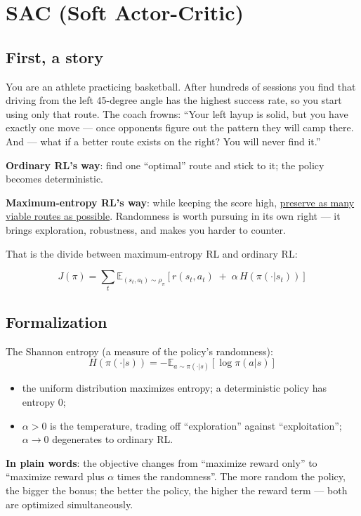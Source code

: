 \documentclass{article}
\begin{document}
\section*{SAC (Soft Actor-Critic)}

\subsection*{First, a story}

You are an athlete practicing basketball. After hundreds of sessions you find that driving from the left 45-degree angle has the highest success rate, so you start using only that route. The coach frowns: ``Your left layup is solid, but you have exactly one move --- once opponents figure out the pattern they will camp there. And --- what if a better route exists on the right? You will never find it.''

\textbf{Ordinary RL's way}: find one ``optimal'' route and stick to it; the policy becomes deterministic.

\textbf{Maximum-entropy RL's way}: while keeping the score high, \underline{preserve as many viable routes as possible}. Randomness is worth pursuing in its own right --- it brings exploration, robustness, and makes you harder to counter.

That is the divide between maximum-entropy RL and ordinary RL:

\[
\boxed{J(\pi) = \sum_t \mathbb{E}_{(s_t,a_t)\sim\rho_\pi}\!\left[r(s_t,a_t) \;+\; \alpha\,H\!\left(\pi(\cdot|s_t)\right)\right]}
\]

\subsection*{Formalization}

The Shannon entropy (a measure of the policy's randomness):
\[
H(\pi(\cdot|s)) = -\mathbb{E}_{a\sim\pi(\cdot|s)}\!\left[\log\pi(a|s)\right]
\]

\begin{itemize}
  \item the uniform distribution maximizes entropy; a deterministic policy has entropy $0$;
  \item $\alpha > 0$ is the temperature, trading off ``exploration'' against ``exploitation''; $\alpha \to 0$ degenerates to ordinary RL.
\end{itemize}

\textbf{In plain words}: the objective changes from ``maximize reward only'' to ``maximize reward plus $\alpha$ times the randomness''. The more random the policy, the bigger the bonus; the better the policy, the higher the reward term --- both are optimized simultaneously.
\end{document}
